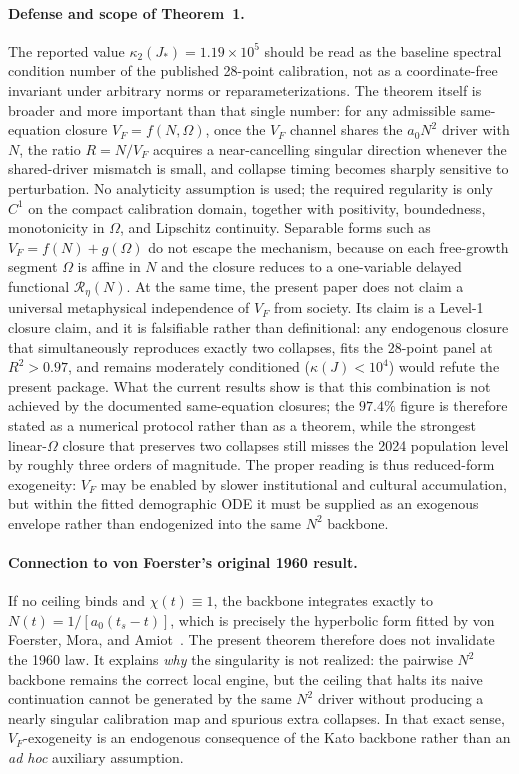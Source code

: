 \documentclass[11pt]{article}
\begin{document}
\paragraph{Defense and scope of Theorem~1.}
The reported value $\kappa_2(J_*)=1.19\times 10^5$ should be read as the baseline spectral condition number of the published 28-point calibration, not as a coordinate-free invariant under arbitrary norms or reparameterizations.  The theorem itself is broader and more important than that single number: for any admissible same-equation closure $V_F=f(N,\Omega)$, once the $V_F$ channel shares the $a_0N^2$ driver with $N$, the ratio $R=N/V_F$ acquires a near-cancelling singular direction whenever the shared-driver mismatch is small, and collapse timing becomes sharply sensitive to perturbation.  No analyticity assumption is used; the required regularity is only $C^1$ on the compact calibration domain, together with positivity, boundedness, monotonicity in $\Omega$, and Lipschitz continuity.  Separable forms such as $V_F=f(N)+g(\Omega)$ do not escape the mechanism, because on each free-growth segment $\Omega$ is affine in $N$ and the closure reduces to a one-variable delayed functional $\mathcal R_\eta(N)$.  At the same time, the present paper does not claim a universal metaphysical independence of $V_F$ from society.  Its claim is a Level-1 closure claim, and it is falsifiable rather than definitional: any endogenous closure that simultaneously reproduces exactly two collapses, fits the 28-point panel at $R^2>0.97$, and remains moderately conditioned ($\kappa(J)<10^4$) would refute the present package.  What the current results show is that this combination is not achieved by the documented same-equation closures; the $97.4\%$ figure is therefore stated as a numerical protocol rather than as a theorem, while the strongest linear-$\Omega$ closure that preserves two collapses still misses the 2024 population level by roughly three orders of magnitude.  The proper reading is thus reduced-form exogeneity: $V_F$ may be enabled by slower institutional and cultural accumulation, but within the fitted demographic ODE it must be supplied as an exogenous envelope rather than endogenized into the same $N^2$ backbone.

\paragraph{Connection to von Foerster's original 1960 result.}
If no ceiling binds and $\chi(t)\equiv 1$, the backbone integrates exactly to $N(t)=1/[a_0(t_s-t)]$, which is precisely the hyperbolic form fitted by von Foerster, Mora, and Amiot~\cite{vonfoerster1960}.
The present theorem therefore does not invalidate the 1960 law.
It explains \emph{why} the singularity is not realized: the pairwise $N^2$ backbone remains the correct local engine, but the ceiling that halts its naive continuation cannot be generated by the same $N^2$ driver without producing a nearly singular calibration map and spurious extra collapses.
In that exact sense, $V_F$-exogeneity is an endogenous consequence of the Kato backbone rather than an \emph{ad hoc} auxiliary assumption.
\end{document}
